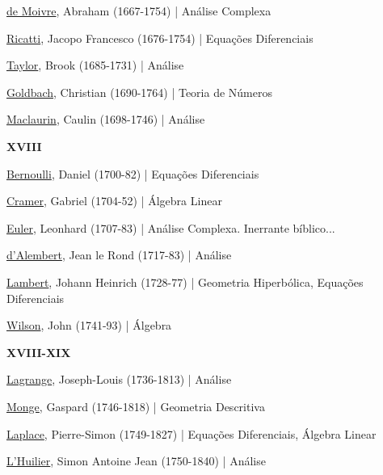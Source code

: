\documentclass[12pt,a4paper]{article}
\begin{document}
			\href{http://en.wikipedia.org/wiki/Demoivre}{de Moivre}, Abraham (1667-1754) | An\'alise Complexa

			\href{http://en.wikipedia.org/wiki/Ricatti}{Ricatti}, Jacopo Francesco (1676-1754) | Equa\c{c}\~oes Diferenciais

			\href{http://pt.wikipedia.org/wiki/Brook_Taylor}{Taylor}, Brook (1685-1731) | An\'alise

			\href{http://en.wikipedia.org/wiki/Christian_Goldbach}{Goldbach}, Christian (1690-1764) | Teoria de N\'umeros

			\href{http://en.wikipedia.org/wiki/Colin_Maclaurin}{Maclaurin}, Caulin (1698-1746) | An\'alise

			\begin{flushright}
			\end{flushright}

			\textbf{XVIII}

			\href{http://pt.wikipedia.org/wiki/Daniel_Bernoulli}{Bernoulli}, Daniel (1700-82) | Equa\c{c}\~oes Diferenciais

			\href{http://en.wikipedia.org/wiki/Gabriel_Cramer}{Cramer}, Gabriel (1704-52) | \'Algebra Linear

			\href{http://pt.wikipedia.org/wiki/Leonhard_Euler}{Euler}, Leonhard (1707-83) | An\'alise Complexa. Inerrante b\'iblico...

			\href{http://pt.wikipedia.org/wiki/Alembert}{d'Alembert}, Jean le Rond (1717-83) | An\'alise

			\href{http://en.wikipedia.org/wiki/Johann_Heinrich_Lambert}{Lambert}, Johann Heinrich (1728-77) | Geometria Hiperb\'olica, Equa\c{c}\~oes Diferenciais

			\href{http://en.wikipedia.org/wiki/John_Wilson_(mathematician)}{Wilson}, John (1741-93) | \'Algebra

			\begin{flushright}
			\end{flushright}

			\textbf{XVIII-XIX}

			\href{http://pt.wikipedia.org/wiki/Lagrange}{Lagrange}, Joseph-Louis (1736-1813) | An\'alise

			\href{http://en.wikipedia.org/wiki/Gaspard_Monge}{Monge}, Gaspard (1746-1818) | Geometria Descritiva

			\href{http://pt.wikipedia.org/wiki/Pierre_Simon_Laplace}{Laplace}, Pierre-Simon (1749-1827) | Equa\c{c}\~oes Diferenciais, \'Algebra Linear

			\href{http://en.wikipedia.org/wiki/Lhuilier}{L'Huilier}, Simon Antoine Jean (1750-1840) | An\'alise
\end{document}
